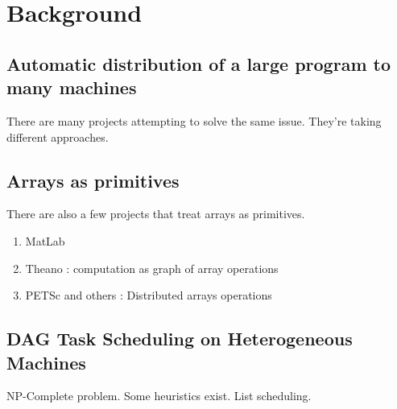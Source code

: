 \section{Background}

\subsection{Automatic distribution of a large program to many machines}
There are many projects attempting to solve the same issue. They're taking
different approaches. 

\subsection{Arrays as primitives}
There are also a few projects that treat arrays as primitives. 
\begin{enumerate}
\item MatLab
\item Theano : computation as graph of array operations
\item PETSc and others : Distributed arrays operations
\end{enumerate}

\subsection{DAG Task Scheduling on Heterogeneous Machines}
NP-Complete problem. Some heuristics exist. List scheduling. 

